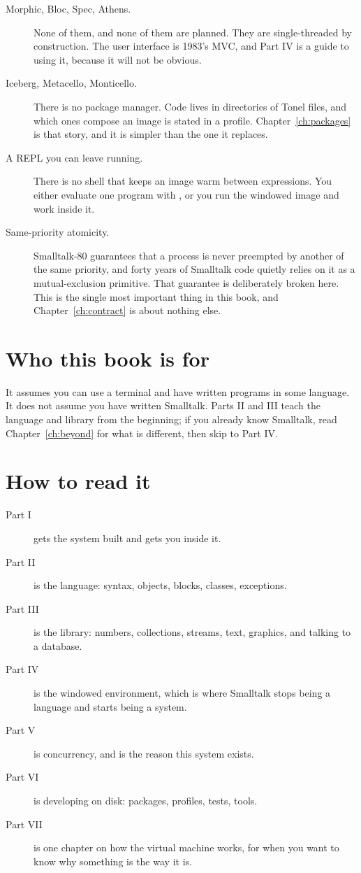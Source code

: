 \begin{description}
\item[Morphic, Bloc, Spec, Athens.] None of them, and none of them are
  planned. They are single-threaded by construction. The user interface is
  1983's MVC, and Part IV is a guide to using it, because it will not be
  obvious.
\item[Iceberg, Metacello, Monticello.] There is no package manager. Code
  lives in directories of Tonel files, and which ones compose an image is
  stated in a profile. Chapter~\ref{ch:packages} is that story, and it is
  simpler than the one it replaces.
\item[A REPL you can leave running.] There is no  shell that keeps
  an image warm between expressions. You either evaluate one program with
  , or you run the windowed image and work inside it.
\item[Same-priority atomicity.] Smalltalk-80 guarantees that a process is
  never preempted by another of the same priority, and forty years of
  Smalltalk code quietly relies on it as a mutual-exclusion primitive. That
  guarantee is deliberately broken here. This is the single most important
  thing in this book, and Chapter~\ref{ch:contract} is about nothing else.
\end{description}

\section{Who this book is for}

It assumes you can use a terminal and have written programs in some language.
It does not assume you have written Smalltalk. Parts II and III teach the
language and library from the beginning; if you already know Smalltalk, read
Chapter~\ref{ch:beyond} for what is different, then skip to Part IV.

\section{How to read it}

\begin{description}
\item[Part I] gets the system built and gets you inside it.
\item[Part II] is the language: syntax, objects, blocks, classes, exceptions.
\item[Part III] is the library: numbers, collections, streams, text, graphics,
  and talking to a database.
\item[Part IV] is the windowed environment, which is where Smalltalk stops
  being a language and starts being a system.
\item[Part V] is concurrency, and is the reason this system exists.
\item[Part VI] is developing on disk: packages, profiles, tests, tools.
\item[Part VII] is one chapter on how the virtual machine works, for when you
  want to know why something is the way it is.
\end{description}

